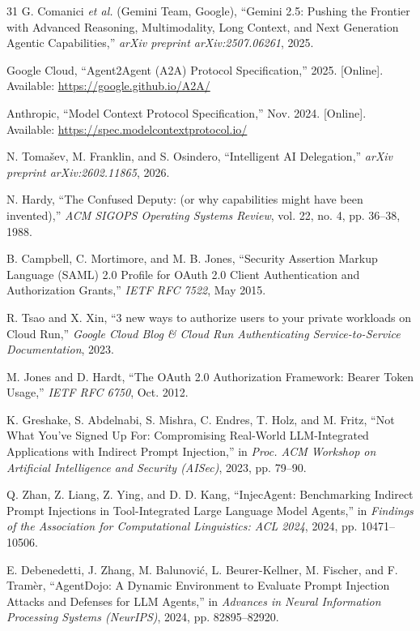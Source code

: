 \documentclass[conference,10pt]{IEEEtran}
\begin{document}
\begin{thebibliography}{31}
G. Comanici \emph{et al.} (Gemini Team, Google), ``Gemini 2.5: Pushing the Frontier with Advanced Reasoning, Multimodality, Long Context, and Next Generation Agentic Capabilities,'' \emph{arXiv preprint arXiv:2507.06261}, 2025.

Google Cloud, ``Agent2Agent (A2A) Protocol Specification,'' 2025. [Online]. Available: \url{https://google.github.io/A2A/}

Anthropic, ``Model Context Protocol Specification,'' Nov. 2024. [Online]. Available: \url{https://spec.modelcontextprotocol.io/}

N. Toma\v{s}ev, M. Franklin, and S. Osindero, ``Intelligent AI Delegation,'' \emph{arXiv preprint arXiv:2602.11865}, 2026.

N. Hardy, ``The Confused Deputy: (or why capabilities might have been invented),'' \emph{ACM SIGOPS Operating Systems Review}, vol. 22, no. 4, pp. 36--38, 1988.

B. Campbell, C. Mortimore, and M. B. Jones, ``Security Assertion Markup Language (SAML) 2.0 Profile for OAuth 2.0 Client Authentication and Authorization Grants,'' \emph{IETF RFC 7522}, May 2015.

R. Tsao and X. Xin, ``3 new ways to authorize users to your private workloads on Cloud Run,'' \emph{Google Cloud Blog \& Cloud Run Authenticating Service-to-Service Documentation}, 2023.

M. Jones and D. Hardt, ``The OAuth 2.0 Authorization Framework: Bearer Token Usage,'' \emph{IETF RFC 6750}, Oct. 2012.

K. Greshake, S. Abdelnabi, S. Mishra, C. Endres, T. Holz, and M. Fritz, ``Not What You've Signed Up For: Compromising Real-World LLM-Integrated Applications with Indirect Prompt Injection,'' in \emph{Proc. ACM Workshop on Artificial Intelligence and Security (AISec)}, 2023, pp. 79--90.

Q. Zhan, Z. Liang, Z. Ying, and D. D. Kang, ``InjecAgent: Benchmarking Indirect Prompt Injections in Tool-Integrated Large Language Model Agents,'' in \emph{Findings of the Association for Computational Linguistics: ACL 2024}, 2024, pp. 10471--10506.

E. Debenedetti, J. Zhang, M. Balunovi{\'c}, L. Beurer-Kellner, M. Fischer, and F. Tram{\`e}r, ``AgentDojo: A Dynamic Environment to Evaluate Prompt Injection Attacks and Defenses for LLM Agents,'' in \emph{Advances in Neural Information Processing Systems (NeurIPS)}, 2024, pp. 82895--82920.


\end{thebibliography}
\end{document}
